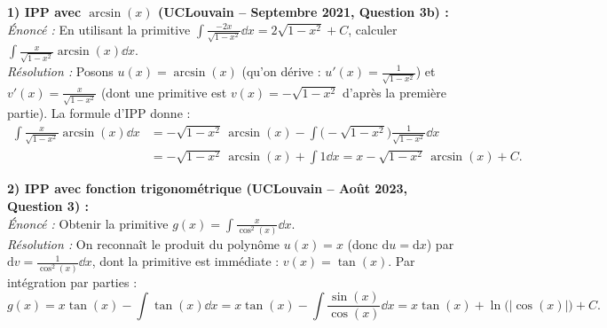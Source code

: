 \begin{exemple}
\textbf{1) IPP avec $\arcsin(x)$ (UCLouvain -- Septembre 2021, Question 3b) :}\\
\emph{Énoncé :} En utilisant la primitive $\displaystyle\int \frac{-2x}{\sqrt{1-x^2}}\dd x = 2\sqrt{1-x^2} + C$, calculer $\displaystyle\int \frac{x}{\sqrt{1-x^2}}\arcsin(x)\dd x$.\\
\emph{Résolution :} Posons $u(x) = \arcsin(x)$ (qu'on dérive : $u'(x) = \frac{1}{\sqrt{1-x^2}}$) et $v'(x) = \frac{x}{\sqrt{1-x^2}}$ (dont une primitive est $v(x) = -\sqrt{1-x^2}$ d'après la première partie). La formule d'IPP donne :
\begin{align*}
    \int \frac{x}{\sqrt{1-x^2}}\arcsin(x)\dd x &= -\sqrt{1-x^2}\,\arcsin(x) - \int \bigl(-\sqrt{1-x^2}\bigr)\frac{1}{\sqrt{1-x^2}}\dd x \\
    &= -\sqrt{1-x^2}\,\arcsin(x) + \int 1\dd x = \boxed{x - \sqrt{1-x^2}\,\arcsin(x) + C}.
\end{align*}

\medskip
\textbf{2) IPP avec fonction trigonométrique (UCLouvain -- Août 2023, Question 3) :}\\
\emph{Énoncé :} Obtenir la primitive $g(x) = \displaystyle\int \frac{x}{\cos^2(x)}\dd x$.\\
\emph{Résolution :} On reconnaît le produit du polynôme $u(x) = x$ (donc $\mathrm{d}u = \mathrm{d}x$) par $\mathrm{d}v = \frac{1}{\cos^2(x)}\dd x$, dont la primitive est immédiate : $v(x) = \tan(x)$. Par intégration par parties :
\[
    g(x) = x\tan(x) - \int \tan(x)\dd x = x\tan(x) - \int \frac{\sin(x)}{\cos(x)}\dd x = \boxed{x\tan(x) + \ln\bigl(|\cos(x)|\bigr) + C}.
\]


\end{exemple}
